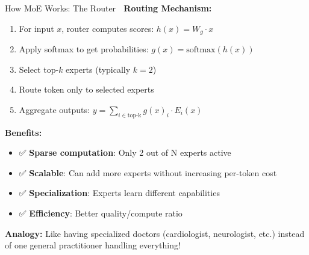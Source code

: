 \documentclass[aspectratio=169]{beamer}
\begin{document}
\begin{frame}[shrink=10]{How MoE Works: The Router 🎯}
\textbf{Routing Mechanism:}

\begin{enumerate}\setlength{\itemsep}{0pt}
    \item For input $x$, router computes scores: $h(x) = W_g \cdot x$
    \item Apply softmax to get probabilities: $g(x) = \text{softmax}(h(x))$
    \item Select top-$k$ experts (typically $k=2$)
    \item Route token only to selected experts
    \item Aggregate outputs: $y = \sum_{i \in \text{top-k}} g(x)_i \cdot E_i(x)$
\end{enumerate}

\vspace{1em}

\textbf{Benefits:}
\begin{itemize}\setlength{\itemsep}{0pt}
    \item ✅ \textbf{Sparse computation}: Only 2 out of N experts active
    \item ✅ \textbf{Scalable}: Can add more experts without increasing per-token cost
    \item ✅ \textbf{Specialization}: Experts learn different capabilities
    \item ✅ \textbf{Efficiency}: Better quality/compute ratio
\end{itemize}

\vspace{0.5em}

\begin{thinkbox}
\textbf{Analogy:} Like having specialized doctors (cardiologist, neurologist, etc.) instead of one general practitioner handling everything!
\end{thinkbox}
\end{frame}
\end{document}
